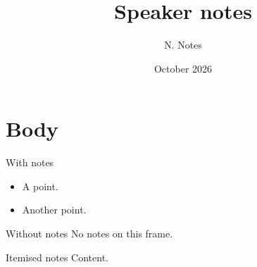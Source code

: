 \documentclass{beamer}
\title{Speaker notes}
\author{N. Notes}
\date{October 2026}
\begin{document}
\begin{frame}\titlepage
\end{frame}
\section{Body}
\begin{frame}{With notes}
  \begin{itemize}
    \item A point.
    \item<2-> Another point.
  \end{itemize}
\end{frame}
\begin{frame}{Without notes}
  No notes on this frame.
\end{frame}
\begin{frame}{Itemised notes}
  Content.
\end{frame}
\end{document}
